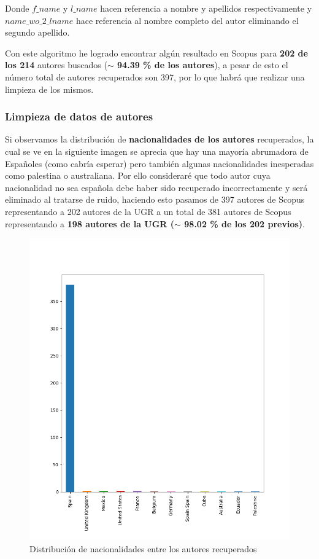 Donde $f\_name$ y $l\_name$ hacen referencia a nombre y apellidos respectivamente y $name\_wo\_2\_lname$ hace referencia al nombre completo del autor eliminando el segundo apellido.

Con este algoritmo he logrado encontrar algún resultado en Scopus para \textbf{202 de los 214} autores buscados (\textbf{$\sim$ 94.39 \% de los autores}), a pesar de esto el número total de autores recuperados son 397, por lo que habrá que realizar una limpieza de los mismos.

\subsubsection{Limpieza de datos de autores}
Si observamos la distribución de \textbf{nacionalidades de los autores} recuperados, la cual se ve en la siguiente imagen se aprecia que hay una mayoría abrumadora de Españoles (como cabría esperar) pero también algunas nacionalidades inesperadas como palestina o australiana. Por ello consideraré que todo autor cuya nacionalidad no sea española debe haber sido recuperado incorrectamente y será eliminado al tratarse de ruido, haciendo esto pasamos de 397 autores de Scopus representando a 202 autores de la \acrshort{UGR} a un total de 381 autores de Scopus representando a \textbf{198 autores de la \acrshort{UGR} ($\sim$ 98.02 \% de los 202 previos)}.

\begin{figure}[h!]
	
	\centering
	\includegraphics[width=0.9\linewidth]{imagenes/country_hist}
	\caption{Distribución de nacionalidades entre los autores recuperados}
\end{figure}

